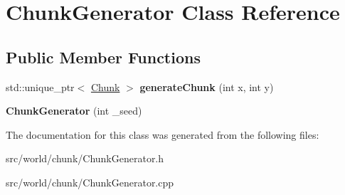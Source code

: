 \hypertarget{classChunkGenerator}{\section{Chunk\-Generator Class Reference}
\label{classChunkGenerator}
}
\subsection*{Public Member Functions}
\begin{DoxyCompactItemize}
\item 
\hypertarget{classChunkGenerator_acb1e4d2b1d2d620a92fd3e311ddd42cf}{std\-::unique\-\_\-ptr$<$ \hyperlink{classChunk}{Chunk} $>$ {\bfseries generate\-Chunk} (int x, int y)}\label{classChunkGenerator_acb1e4d2b1d2d620a92fd3e311ddd42cf}

\item 
\hypertarget{classChunkGenerator_a97d6306195054b3132c0230a0c092a80}{{\bfseries Chunk\-Generator} (int \-\_\-seed)}\label{classChunkGenerator_a97d6306195054b3132c0230a0c092a80}

\end{DoxyCompactItemize}


The documentation for this class was generated from the following files\-:\begin{DoxyCompactItemize}
\item 
src/world/chunk/Chunk\-Generator.\-h\item 
src/world/chunk/Chunk\-Generator.\-cpp\end{DoxyCompactItemize}
